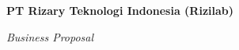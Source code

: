 \documentclass[Rizilab.tex]{subfile}
\begin{document}
  \begin{titlepage}
    \begin{center}
      \Large\textbf{PT Rizary Teknologi Indonesia (Rizilab)}
      
      \large\textit{Business Proposal}
    \end{center}
  \end{titlepage}
\end{document}
